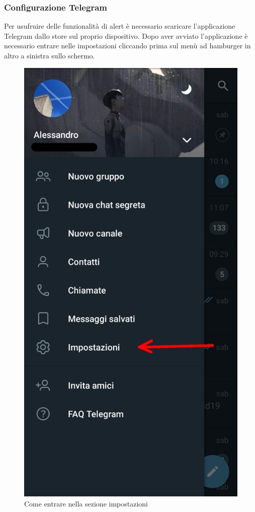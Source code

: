 	\subsubsection{Configurazione Telegram}
		Per usufruire delle funzionalità di alert è necessario scaricare l'applicazione Telegram dallo store sul proprio dispositivo.
		Dopo aver avviato l'applicazione è necessario entrare nelle impostazioni cliccando prima sul menù ad hamburger in altro a sinistra sullo schermo.
		\begin{figure}[H]
			\centering
			\includegraphics[scale=0.100]{res/images/telegram1.jpg}
			\caption{Come entrare nella sezione impostazioni}
			\label{Screenshot1}
		\end{figure}
